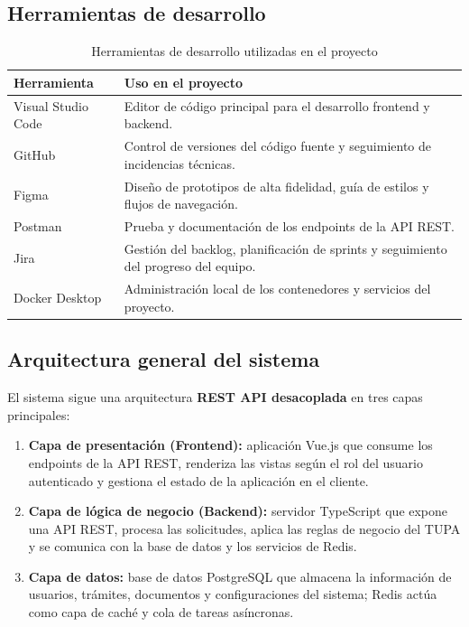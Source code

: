 \subsection*{Herramientas de desarrollo}

\begin{table}[H]
\centering
\caption{Herramientas de desarrollo utilizadas en el proyecto}
\label{tab:herramientas}
\begin{tabular}{|p{4cm}|p{9.5cm}|}
\hline
\textbf{Herramienta} & \textbf{Uso en el proyecto} \\
\hline
Visual Studio Code & Editor de código principal para el desarrollo frontend y backend. \\
\hline
GitHub & Control de versiones del código fuente y seguimiento de incidencias técnicas. \\
\hline
Figma & Diseño de prototipos de alta fidelidad, guía de estilos y flujos de navegación. \\
\hline
Postman & Prueba y documentación de los endpoints de la API REST. \\
\hline
Jira & Gestión del backlog, planificación de sprints y seguimiento del progreso del equipo. \\
\hline
Docker Desktop & Administración local de los contenedores y servicios del proyecto. \\
\hline
\end{tabular}
\end{table}

\subsection*{Arquitectura general del sistema}

El sistema sigue una arquitectura \textbf{REST API desacoplada} en tres capas principales:

\begin{enumerate}
    \item \textbf{Capa de presentación (Frontend):} aplicación Vue.js que consume los
            endpoints de la API REST, renderiza las vistas según el rol del usuario autenticado
            y gestiona el estado de la aplicación en el cliente.
    \item \textbf{Capa de lógica de negocio (Backend):} servidor TypeScript que expone una
            API REST, procesa las solicitudes, aplica las reglas de negocio del TUPA y se
            comunica con la base de datos y los servicios de Redis.
    \item \textbf{Capa de datos:} base de datos PostgreSQL que almacena la información de
            usuarios, trámites, documentos y configuraciones del sistema; Redis actúa como
            capa de caché y cola de tareas asíncronas.
\end{enumerate}

